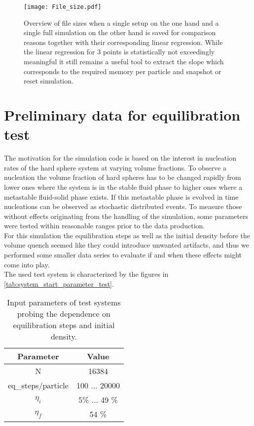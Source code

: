 \begin{figure}[h!]
\centering
\texttt{[image: File\_size.pdf]}
\caption[File size estimate]{Overview of file sizes when a single setup on the one hand and a single full simulation on the other hand is saved for comparison reasons together with their corresponding linear regression. While the linear regression for 3 points is statistically not exceedingly meaningful it still remains a useful tool to extract the slope which corresponds to the required memory per particle and snapshot or reset simulation.}
\label{fig:file_size}
\end{figure}

\section{Preliminary data for equilibration test}
\label{sec:data}
The motivation for the simulation code is based on the interest in nucleation rates of the hard sphere system at varying volume fractions. To observe a nucleation the volume fraction of hard spheres has to be changed rapidly from lower ones where the system is in the stable fluid phase to higher ones where a metastable fluid-solid phase exists. If this metastable phase is evolved in time nucleations can be observed as stochastic distributed events. To measure those without effects originating from the handling of the simulation, some parameters were tested within reasonable ranges prior to the data production.\\
For this simulation the equilibration steps as well as the initial density before the volume quench seemed like they could introduce unwanted artifacts, and thus we performed some smaller data series to evaluate if and when these effects might come into play.\\

The used test system is characterized by the figures in \autoref{tab:system_start_parameter_test}.

\begin{table}
\centering
\begin{tabular}{c|c}
Parameter & Value \\ \hline
N & 16384 \\
eq\_steps/particle & 100 ... 20000 \\
$\eta_i$ & 5\% ... 49 \% \\
$\eta_f$ & 54 \% \\
\end{tabular}
\caption[Simulation parameters for testing equilibration step number and initial density]{Input parameters of test systems probing the dependence on equilibration steps and initial density.}
\label{tab:system_start_parameter_test}
\end{table}

